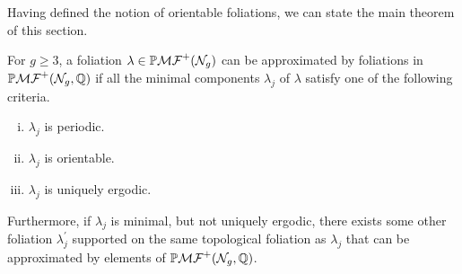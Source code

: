 \documentclass[12pt, reqno]{amsart}
\begin{document}
Having defined the notion of orientable foliations, we can state the main theorem of this section.
\begin{theorem}
  \label{thm:rational-approximation}
  For $g \geq 3$, a foliation $\lambda \in \mathbb{P}\mathcal{MF}^+(\mathcal{N}_g)$ can be approximated by foliations in $\mathbb{P}\mathcal{MF}^+(\mathcal{N}_g, \mathbb{Q})$ if all the minimal components $\lambda_j$ of $\lambda$ satisfy one of the following criteria.
  \begin{enumerate}[(i)]
  \item $\lambda_j$ is periodic.
  \item $\lambda_j$ is orientable.
  \item $\lambda_j$ is uniquely ergodic.
  \end{enumerate}
  Furthermore, if $\lambda_j$ is minimal, but not uniquely ergodic, there exists some other foliation $\lambda_j^{\prime}$ supported on the same topological foliation as $\lambda_j$ that can be approximated by elements of $\mathbb{P}\mathcal{MF}^+(\mathcal{N}_g, \mathbb{Q})$.
\end{theorem}
\end{document}
